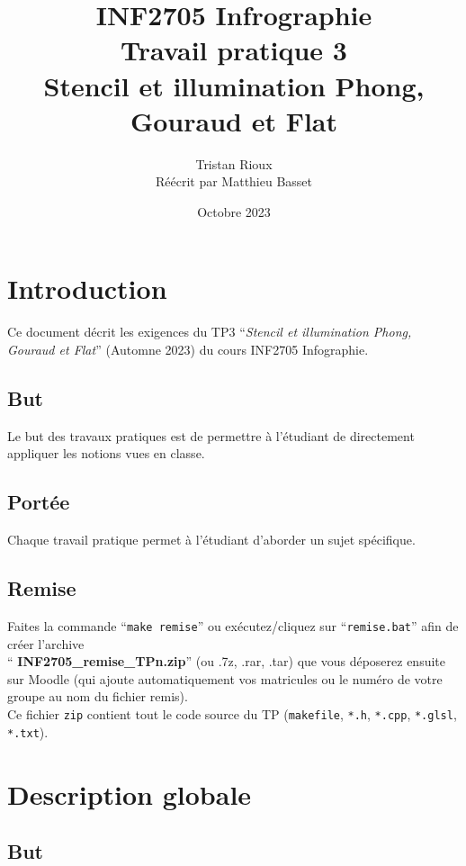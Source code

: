 \documentclass{article}[letterpaper, 11pt]
\title{INF2705 Infrographie\\
Travail pratique 3\\
Stencil et illumination Phong, Gouraud et
Flat}
\date{Octobre 2023}
\author{Tristan Rioux\\ \scriptsize Réécrit par Matthieu Basset}
\renewcommand{\thepage}{}
\begin{document}
\thispagestyle{empty}
\maketitle
\newpage

\renewcommand{\thepage}{\arabic{page}}
\pagestyle{fancy}
\renewcommand{\contentsname}{Table des matières}
\setcounter{page}{1}
\tableofcontents


\newpage

\section{Introduction}
Ce document décrit les exigences du TP3 ``\textit{Stencil et illumination Phong, Gouraud et Flat}'' (Automne
2023) du cours INF2705 Infographie.
\subsection{But}
Le but des travaux pratiques est de permettre à l'étudiant de directement appliquer les notions vues
en classe.

\subsection{Portée}
Chaque travail pratique permet à l'étudiant d'aborder un sujet spécifique.

\subsection{Remise}
Faites la commande ``\texttt{make remise}'' ou exécutez/cliquez sur ``\texttt{remise.bat}'' afin de créer l'archive \\``\textbf{ INF2705\_remise\_TPn.zip}'' (ou .7z, .rar, .tar) que vous déposerez ensuite sur Moodle (qui ajoute automatiquement vos matricules ou le numéro de votre groupe au nom du fichier remis).\\
Ce fichier \texttt{zip} contient tout le code source du TP (\texttt{makefile}, \texttt{*.h}, \texttt{*.cpp}, \texttt{*.glsl}, \texttt{*.txt}).

\newpage
\section{Description globale}
\subsection{But}
\end{document}
